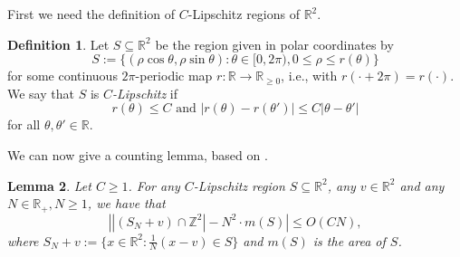 \documentclass[11pt]{amsart}
\newtheorem{lemma}{Lemma}[section]
\theoremstyle{definition}
\newtheorem{definition}[lemma]{Definition}
\newcommand{\R}{{\mathbb R}}
\newcommand{\Z}{{\mathbb Z}}
\begin{document}
First we need the definition of $C$-Lipschitz regions of $\R^2$.
\begin{definition}
Let $S\subseteq \mathbb{R}^{2}$ be the region given in polar coordinates by
     $$S:=\{(\rho\cos\theta,\rho\sin\theta)\colon \theta\in [0,2\pi), 0\leq \rho\leq r(\theta)\}$$
     for some continuous $2\pi$-periodic map $r\colon \R\to \R_{\geq 0}$, i.e., with $r(\cdot+2\pi)=r(\cdot)$. We say that $S$ is \emph{$C$-Lipschitz} if
     $$r(\theta)\leq C\text{ and } \vert r(\theta)-r(\theta')\vert\leq C\vert\theta-\theta'\vert$$
      for all $\theta,\theta'\in\R$.
\end{definition}
We can now give a counting lemma, based on \cite[Lemma~10.1]{kubiliusbook}.
 \begin{lemma}\label{dafp}
 Let $C\geq 1$.
 For any  $C$-Lipschitz region $S\subseteq \mathbb{R}^{2}$, any $v\in\R^{2}$ and any $N\in\R_{+}, N\geq 1$,  we have that
$$\left|\left| (S_{N}+v)\cap \Z^{2}\right|-N^{2}\cdot m(S)\right|\leq O(CN),$$
where $S_{N}+v:=\{x\in\R^{2}\colon \frac{1}{N}(x-v)\in S\}$ and $m(S)$ is the area of $S$.
 \end{lemma}
\end{document}
